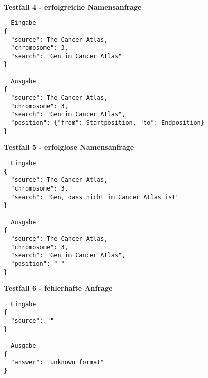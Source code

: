 \documentclass{scrartcl}
\begin{document}
\newpage\hfill\\
\textbf{Testfall 4 - erfolgreiche Namensanfrage}
\begin{verbatim}
  Eingabe
{
  "source": The Cancer Atlas,
  "chromosome": 3,
  "search": "Gen im Cancer Atlas"
}

  Ausgabe
{
  "source": The Cancer Atlas,
  "chromosome": 3,
  "search": "Gen im Cancer Atlas",
  "position": {"from": Startposition, "to": Endposition}
}
\end{verbatim}
\textbf{Testfall 5 - erfolglose Namensanfrage}
\begin{verbatim}
  Eingabe
{
  "source": The Cancer Atlas,
  "chromosome": 3,
  "search": "Gen, dass nicht im Cancer Atlas ist"
}

  Ausgabe
{
  "source": The Cancer Atlas,
  "chromosome": 3,
  "search": "Gen im Cancer Atlas",
  "position": " "
}
\end{verbatim}
\textbf{Testfall 6 - fehlerhafte Anfrage}
\begin{verbatim}
  Eingabe
{
  "source": ""
}

  Ausgabe
{
  "answer": "unknown format"
}
\end{verbatim}
\newpage
\end{document}
